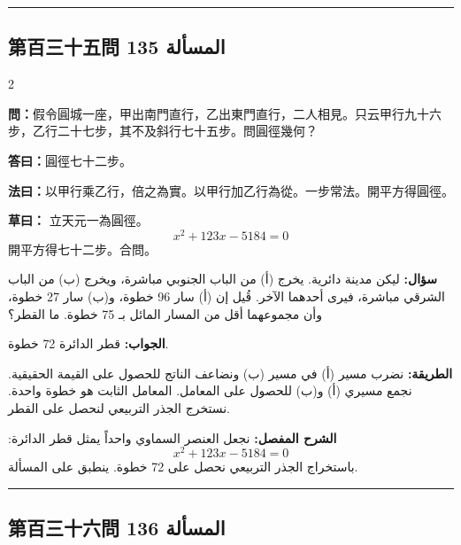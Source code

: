 \documentclass[11pt,a4paper]{article}
\newcommand{\ar}[1]{\arabicfont\beginR #1\endR}
\newcommand{\arb}[1]{\textbf{\arabicfont\beginR #1\endR}}
\newcommand{\longline}{\noindent\rule{\textwidth}{0.4pt}}
\newcommand{\arnote}[1]{\textcolor{arabicblue}{\ar{#1}}}
\newcommand{\wen}[1]{\par\noindent\textbf{\textcolor{probcolor}{問：}}{#1}\par}
\newcommand{\da}[1]{\par\noindent\textbf{\textcolor{anscolor}{答曰：}}{#1}\par}
\newcommand{\fayue}[1]{\par\noindent\textbf{\textcolor{methodcolor}{法曰：}}{#1}\par}
\newcommand{\caoyue}[1]{\par\noindent\textbf{草曰：}{#1}\par}
\newcommand{\arwen}[1]{\par\noindent\arb{سؤال: }\arnote{#1}\par}
\newcommand{\arjwb}[1]{\par\noindent\arb{الجواب: }\arnote{#1}\par}
\newcommand{\arqwd}[1]{\par\noindent\arb{الطريقة: }\arnote{#1}\par}
\newcommand{\arshr}[1]{\par\noindent\arb{الشرح المفصل: }\arnote{#1}\par}
\begin{document}
\vspace{0.3cm}
\longline

\subsection*{第百三十五問 \hfill \ar{المسألة 135}}

\begin{paracol}{2}

\begin{leftcolumn}
\wen{假令圓城一座，甲出南門直行，乙出東門直行，二人相見。只云甲行九十六步，乙行二十七步，其不及斜行七十五步。問圓徑幾何？}

\da{圓徑七十二步。}

\fayue{以甲行乘乙行，倍之為實。以甲行加乙行為從。一步常法。開平方得圓徑。}

\caoyue{
立天元一為圓徑。
$$x^2 + 123x - 5184 = 0$$
開平方得七十二步。合問。}
\end{leftcolumn}

\begin{rightcolumn}
\arwen{ليكن مدينة دائرية. يخرج (أ) من الباب الجنوبي مباشرة، ويخرج (ب) من الباب الشرقي مباشرة، فيرى أحدهما الآخر. قُيل إن (أ) سار 96 خطوة، و(ب) سار 27 خطوة، وأن مجموعهما أقل من المسار المائل بـ 75 خطوة. ما القطر؟}

\arjwb{قطر الدائرة 72 خطوة.}

\arqwd{نضرب مسير (أ) في مسير (ب) ونضاعف الناتج للحصول على القيمة الحقيقية. نجمع مسيري (أ) و(ب) للحصول على المعامل. المعامل الثابت هو خطوة واحدة. نستخرج الجذر التربيعي لنحصل على القطر.}

\arshr{نجعل العنصر السماوي واحداً يمثل قطر الدائرة:
$$x^2 + 123x - 5184 = 0$$
باستخراج الجذر التربيعي نحصل على 72 خطوة. ينطبق على المسألة.}
\end{rightcolumn}

\end{paracol}

\vspace{0.3cm}
\longline

\subsection*{第百三十六問 \hfill \ar{المسألة 136}}
\end{document}
